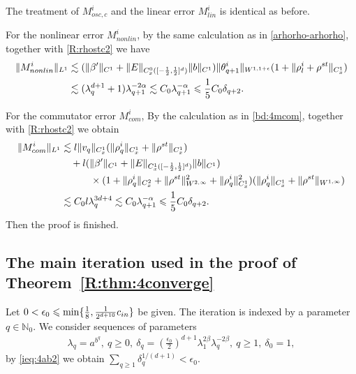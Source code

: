 \documentclass[UTF-8,reqno]{amsart}
\numberwithin{equation}{section}
\theoremstyle{definition}
\def\min{{\mathord{{\rm min}}}}
\def\geq{\geqslant}
\def\leq{\leqslant}
\def\min{{\mathord{{\rm min}}}}
\def\geq{\geqslant}
\def\leq{\leqslant}
\begin{document}
The treatment of $M^i_{osc,c}$ and the linear error $M^i_{ {lin}}$ is identical as before.

For the nonlinear error $M^i_{nonlin} $, by the same calculation as in \eqref{arhorho-arhorho},  together with \eqref{R:rhostc2}  we have
\begin{align}
    \|M^i_{nonlin}\|_{L^1} 
      &\lesssim (\|\beta' \|_{C^1 }+\|E \|_{C_{x}^0([-\frac12,\frac12]^d)}\|b\|_{C^1})\|\theta^{i}_{q+1}\|_{W^{1,1+\epsilon}} (1+\|\rho^{i}_{l}+\rho^{st}\|_{C_{x}^1} ) \notag\\
      &\lesssim (\lambda_{q}^{ d+1}+1)\lambda_{q+1}^{-2\alpha} \lesssim    C_0 \lambda_{q+1}^{-\alpha}\leq \frac{1}{5}C_0 \delta_{q+2}.\notag
\end{align} 
 
 

For the commutator error $M^i_{com} $, By the calculation as in \eqref{bd:4mcom}, together with \eqref{R:rhostc2}   we obtain
 \begin{align}
  \|M^i_{ com} \|_{L^1}  & \lesssim l\|v_q\|_{C_{x}^1}(\|\rho_q^i\|_{C_{x}^1}+\|\rho^{st}\|_{C_{x}^1})\notag\\
  &\quad+l (\|\beta' \|_{C^1}+\|E \|_{C_{x}^1([-\frac12,\frac12]^d)}\|b\|_{C^1})\notag\\
  &\quad\quad\quad\times (1+  \| \rho_q^i \|_{C_{x}^2}+\|\rho^{st}\|_{W^{2,\infty}}^2+\| \rho_q^i\|_{C_{x}^1}^2)(\| \rho_q^i \|_{C_{x}^1}+\|\rho^{st}\|_{W^{1,\infty}})\notag\\
 &\lesssim C_0 l\lambda_q^{3d+4}\lesssim  C_0  \lambda_{q+1}^{-\alpha}\leq \frac{1}{5}C_0 \delta_{q+2}.\notag 
   \end{align}    
Then the proof is finished.





\subsection{The main iteration used in the proof of Theorem~\ref{R:thm:4converge}}
Let $0<\epsilon_0\leq \min\{ \frac18, \frac1 {2^{d+10}} c_{in}\}$ be given.  The iteration is indexed by a parameter
$
q\in\mathbb{N}_0.
$
We consider     sequences of parameters
\begin{align*}
\lambda_q
=
a^{b^q},
\ 
q\geq0,
\ 
\delta_q
=
(\frac{\epsilon_0}{2})^{d+1}
\lambda_1^{2\beta}
\lambda_q^{-2\beta},
\ 
q\geq1,
\ 
\delta_0=1,
\end{align*}  by \eqref{ieq:4ab2} 
we obtain $
\sum_{q\geq1}\delta_q^{1/(d+1)}
<
\epsilon_0. $
 
\end{document}
